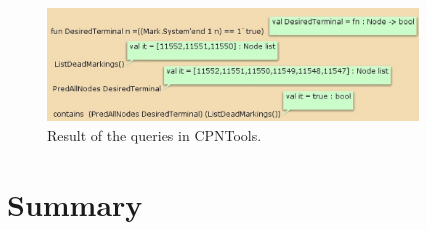 \begin{figure}[h]
\begin{center}%
\includegraphics[width=\textwidth,height=3cm]{Figures/queries.eps}
\vspace{-0.7cm}
\caption{Result of the queries in CPNTools.}\label{queries}
\end{center}
\end{figure}
\vspace{-0.7cm}
%
%




\section{Summary}\label{sumWebServ}

